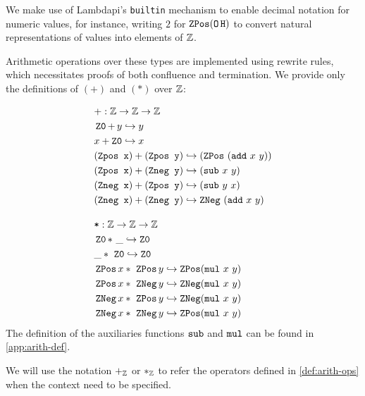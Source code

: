 We make use of Lambdapi's \lstinline[language=Lambdapi,basicstyle=\ttfamily\normalsize]|builtin| mechanism to enable decimal notation for numeric values, for instance, writing $2$ for $\mathop{\texttt{ZPos}} (\mathop{\texttt{O}} \texttt{H})$ to convert natural representations of values into elements of $\mathbb{Z}$.

\begin{definition}\label{def:arith-ops}
Arithmetic operations over these types are implemented using rewrite rules, which necessitates proofs of both confluence and termination.
We provide only the definitions of $(+)$ and $(*)$ over $\mathbb{Z}$:

\begin{align*}
&+: \mathbb{Z} \rightarrow \mathbb{Z} \rightarrow \mathbb{Z} \\
& \mathop{\texttt{Z0}} +\, y \hookrightarrow y \\
& x + \mathop{\texttt{Z0}} \hookrightarrow x \\
& (\texttt{Zpos x}) + (\texttt{Zpos y}) \hookrightarrow (\mathop{\texttt{ZPos}}~(\texttt{add}~x~y))  \\
& (\texttt{Zpos x}) + (\texttt{Zneg y}) \hookrightarrow (\texttt{sub}~x~y)  \\
& (\texttt{Zneg x}) + (\texttt{Zpos y}) \hookrightarrow (\texttt{sub}~y~x)  \\
& (\texttt{Zneg x}) + (\texttt{Zneg y}) \hookrightarrow \mathop{\texttt{ZNeg}}~(\texttt{add}~x~y)\\[1em]
&\texttt{*} : \mathbb{Z} \rightarrow \mathbb{Z} \rightarrow \mathbb{Z} \\
& \mathop{\texttt{Z0}} *~\_ \hookrightarrow \mathop{\texttt{Z0}} \\
& \_ *~\mathop{\texttt{Z0}} \hookrightarrow \mathop{\texttt{Z0}} \\
& \mathop{\texttt{ZPos}} x *~\mathop{\texttt{ZPos}} y \hookrightarrow \mathop{\texttt{ZPos}} (\texttt{mul}~x~y) \\
& \mathop{\texttt{ZPos}} x *~\mathop{\texttt{ZNeg}}    y \hookrightarrow \mathop{\texttt{ZNeg}}    (\texttt{mul}~x~y) \\
& \mathop{\texttt{ZNeg}}    x *~\mathop{\texttt{ZPos}} y \hookrightarrow \mathop{\texttt{ZNeg}}    (\texttt{mul}~x~y) \\
& \mathop{\texttt{ZNeg}}    x *~\mathop{\texttt{ZNeg}}    y \hookrightarrow \mathop{\texttt{ZPos}} (\texttt{mul}~x~y) \\
\end{align*}
The definition of the auxiliaries functions $\texttt{\upshape{sub}}$ and $\texttt{\upshape{mul}}$ can be found in \cref{app:arith-def}.
\end{definition}

\begin{notation}
We will use the notation $+_{\mathbb{Z}}$ or $*_{\mathbb{Z}}$ to refer the operators defined in \cref{def:arith-ops} when the context need to be specified.
\end{notation}

